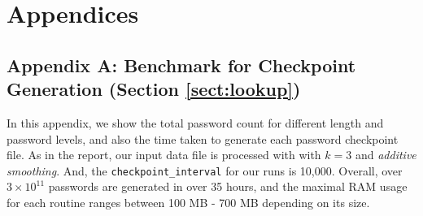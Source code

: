 \documentclass{article} %
\theoremstyle{definition}
\theoremstyle{theorem}
\theoremstyle{remark}
\theoremstyle{remark}
\begin{document}
\section*{Appendices}
\subsection*{Appendix A: Benchmark for Checkpoint Generation (Section \ref{sect:lookup})}
\par\quad In this appendix, we show the total password count for different length and password levels, and also the time taken to generate each password checkpoint file. As in the report, our input data file is processed with with $k=3$ and \emph{additive smoothing}. And, the \texttt{checkpoint\_interval} for our runs is 10,000. Overall, over $3\times 10^{11}$ passwords are generated in over 35 hours, and the maximal RAM usage for each routine ranges between 100 MB - 700 MB depending on its size.
\end{document}
